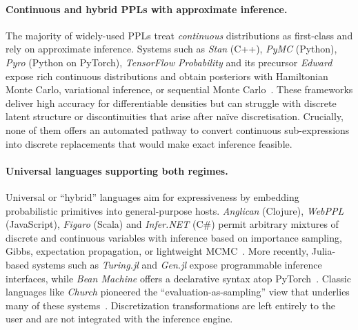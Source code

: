 \paragraph{Continuous and hybrid PPLs with approximate inference.}  
The majority of widely-used PPLs treat \emph{continuous} distributions as first-class and rely on approximate inference. Systems such as \emph{Stan} (C++), \emph{PyMC} (Python), \emph{Pyro} (Python on PyTorch), \emph{TensorFlow Probability} and its precursor \emph{Edward} expose rich continuous distributions and obtain posteriors with Hamiltonian Monte Carlo, variational inference, or sequential Monte Carlo~\cite{Carpenter2017Stan,Salvatier2016PyMC3,Bingham2019Pyro,Dillon2017TFP,Tran2016Edward}. These frameworks deliver high accuracy for differentiable densities but can struggle with discrete latent structure or discontinuities that arise after naïve discretisation. Crucially, none of them offers an automated pathway to convert continuous sub-expressions into discrete replacements that would make exact inference feasible.

\paragraph{Universal languages supporting both regimes.}  
Universal or ``hybrid'' languages aim for expressiveness by embedding probabilistic primitives into general-purpose hosts. \emph{Anglican} (Clojure), \emph{WebPPL} (JavaScript), \emph{Figaro} (Scala) and \emph{Infer.NET} (C\#) permit arbitrary mixtures of discrete and continuous variables with inference based on importance sampling, Gibbs, expectation propagation, or lightweight MCMC~\cite{Tolpin2016Anglican,Goodman2014WebPPL,Pfeffer2009Figaro,Minka2018InferNET}. More recently, Julia-based systems such as \emph{Turing.jl} and \emph{Gen.jl} expose programmable inference interfaces, while \emph{Bean Machine} offers a declarative syntax atop PyTorch~\cite{Ge2018Turing,CusumanoTowner2019Gen,Tehrani2020BeanMachine}. Classic languages like \emph{Church} pioneered the ``evaluation-as-sampling'' view that underlies many of these systems~\cite{Goodman2008Church}. Discretization transformations are left entirely to the user and are not integrated with the inference engine.

